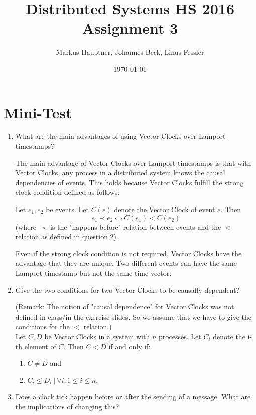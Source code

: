 \documentclass[11pt]{article}
\title{Distributed Systems HS 2016\\Assignment 3}
\author{Markus Hauptner, Johannes Beck, Linus Fessler}
\date{\today}
\begin{document}
\maketitle

\section{Mini-Test}

\begin{enumerate}

\item {What are the main advantages of using Vector Clocks over Lamport timestamps?}
 
The main advantage of Vector Clocks over Lamport timestamps is that with Vector Clocks, any process in a distributed system knows the causal dependencies of events. This holds because Vector Clocks fulfill the strong clock condition defined as follows:

Let $e_1,e_2$ be events. Let $C(e)$ denote the Vector Clock of event $e$. Then $$e_1 \prec e_2 \Longleftrightarrow C(e_1) < C(e_2)$$ (where $\prec$ is the "happens before" relation between events and the $<$ relation as defined in question 2).

Even if the strong clock condition is not required, Vector Clocks have the advantage that they are unique. Two different events can have the same Lamport timestamp but not the same time vector.

\item {Give the two conditions for two Vector Clocks to be causally dependent?}

(Remark: The notion of "causal dependence" for Vector Clocks was not defined in class/in the exercise slides. So we assume that we have to give the conditions for the $<$ relation.)\\
Let $C,D$ be Vector Clocks in a system with $n$ processes. Let $C_i$ denote the i-th element of $C$. Then $C < D$ if and only if:
\begin{enumerate}
\item $C \not= D$ and
\item $C_i \le D_i ~|~\forall i : 1 \le i \le n$.
\end{enumerate}


\item {Does a clock tick happen before or after the sending of a message. What are the implications of changing this?}


\end{enumerate}
\end{document}
